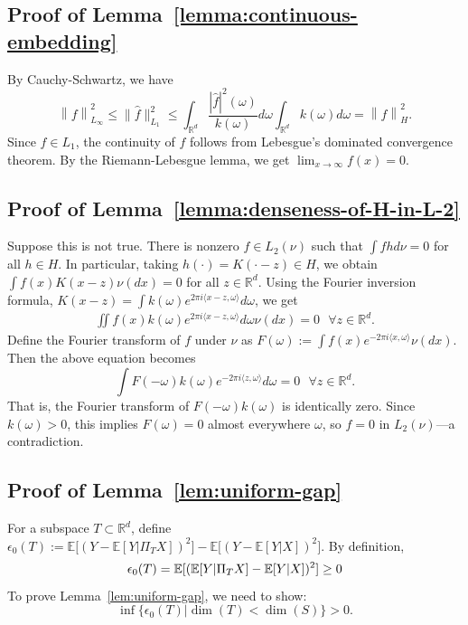 \documentclass[sn-mathphys-num]{sn-jnl}%
\numberwithin{equation}{section}
\newcommand{\R}{\mathbb{R}}
\newcommand{\E}{\mathbb{E}}
\newcommand{\kernel}{K}
\newcommand{\norm}[1]{\left\|{#1}\right\|} %
\newcommand{\eps}{\epsilon}
\theoremstyle{thmstyleone}%
\theoremstyle{thmstyletwo}%
\theoremstyle{thmstylethree}%
\begin{document}
\subsection{Proof of Lemma~\ref{lemma:continuous-embedding}}
\label{sec:proof-of-lemma-continuous-embedding}
By Cauchy-Schwartz, we have 
\begin{equation*}
	\norm{f}_{L_\infty}^2 \le \|\hat{f}\|_{L_1}^2 \le 
		 \int_{\R^d} \frac{|\hat{f}|^2(\omega)}{k(\omega)} d\omega \int_{\R^d} k(\omega) d\omega = \norm{f}_H^2.
\end{equation*} 
Since $\hat{f} \in L_1$, the continuity of $f$ follows from Lebesgue's dominated convergence theorem. 
By the Riemann-Lebesgue lemma, we get $\lim_{x \to \infty} f(x) = 0$.

\subsection{Proof of Lemma~\ref{lemma:denseness-of-H-in-L-2}}
\label{sec:proof-of-lemma-denseness}
Suppose this is not true. There is nonzero $f \in L_2(\nu)$ such that $\int f h d\nu = 0$ 
for all $h \in H$. In particular, taking $h(\cdot) = \kernel(\cdot - z) \in H$, we obtain
$\int f(x) \kernel(x-z)\nu(dx) = 0$ for all $z \in \R^d$.  Using the Fourier inversion formula, 
$\kernel(x-z) =  \int k(\omega) e^{2\pi i \langle x-z, \omega\rangle} d\omega$, we get
\begin{equation*}
\begin{split} 
	\iint f(x)  k(\omega) e^{2\pi i \langle x-z, \omega\rangle} d\omega \nu(dx) = 0~~~\forall z \in \R^d.
\end{split} 
\end{equation*} 
Define the Fourier transform of $f$ under $\nu$ as $F(\omega) := \int f(x) e^{-2\pi i \langle x, \omega \rangle} \nu(dx)$. Then the above equation becomes
\begin{equation*}
	\int F(-\omega) k(\omega) e^{-2\pi i\langle z, \omega\rangle}  d\omega = 0~~~\forall z \in \R^d.
\end{equation*} 
That is, the Fourier transform of $F(-\omega) k (\omega)$ is identically zero. 
Since $k(\omega) > 0$, this implies $F(\omega) = 0$ almost everywhere $\omega$, so $f = 0$ in $L_2(\nu)$—a contradiction.


\subsection{Proof of Lemma~\ref{lem:uniform-gap}}
\label{section:proof-uniform-gap}
For a subspace $T \subset \R^d$, define $\eps_0(T) :=  \E\bigl[(Y - \E[Y | \Pi_T X])^2\bigr] -  \E\bigl[(Y - \E[Y | X])^2\bigr]$. By definition, 
\begin{equation*}
	\eps_0(T) = \E[(\E[Y|\proj_T X]- \E[Y|X])^2] \ge 0
\end{equation*}
To prove Lemma~\ref{lem:uniform-gap}, we need to show: 
\begin{equation}
\label{eqn:general-nonsense}
	\inf \{\eps_0(T) | \dim(T) < \dim(S)\} > 0.
\end{equation}
\end{document}
